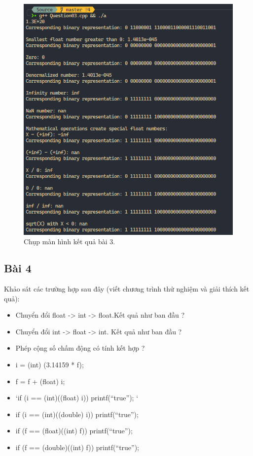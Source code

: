 \begin{figure}[H]
	\centering
	\includegraphics[width=\textwidth]{images/img3.PNG}
	\caption{Chụp màn hình kết quả bài 3.}
\end{figure}

\subsection{Bài 4}
Khảo sát các trường hợp sau đây (viết chương trình thử nghiệm và giải thích kết quả):

\begin{itemize}
	\item Chuyển đổi float -> int -> float.Kết quả như ban đầu ?
	\item Chuyển đổi int -> float -> int. Kết quả như ban đầu ?
	\item Phép cộng số chấm động có tính kết hợp ?
	\item i = (int) (3.14159 * f);
	\item f = f + (float) i;
	\item `if (i == (int)((float) i)) { printf(“true”); }`
	\item if (i == (int)((double) i)) { printf(“true”); }
	\item if (f == (float)((int) f)) { printf(“true”); }
	\item if (f == (double)((int) f)) { printf(“true”); }
\end{itemize}

